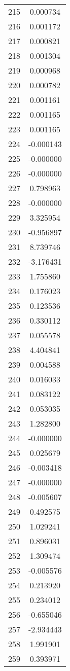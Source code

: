 \documentclass[12pt]{article}
\begin{document}
\begin{longtable}{@{}cc@{}}
215 & 0.000734 \\
216 & 0.001172 \\
217 & 0.000821 \\
218 & 0.001304 \\
219 & 0.000968 \\
220 & 0.000782 \\
221 & 0.001161 \\
222 & 0.001165 \\
223 & 0.001165 \\
224 & -0.000143 \\
225 & -0.000000 \\
226 & -0.000000 \\
227 & 0.798963 \\
228 & -0.000000 \\
229 & 3.325954 \\
230 & -0.956897 \\
231 & 8.739746 \\
232 & -3.176431 \\
233 & 1.755860 \\
234 & 0.176023 \\
235 & 0.123536 \\
236 & 0.330112 \\
237 & 0.055578 \\
238 & 4.404841 \\
239 & 0.004588 \\
240 & 0.016033 \\
241 & 0.083122 \\
242 & 0.053035 \\
243 & 1.282800 \\
244 & -0.000000 \\
245 & 0.025679 \\
246 & -0.003418 \\
247 & -0.000000 \\
248 & -0.005607 \\
249 & 0.492575 \\
250 & 1.029241 \\
251 & 0.896031 \\
252 & 1.309474 \\
253 & -0.005576 \\
254 & 0.213920 \\
255 & 0.234012 \\
256 & -0.655046 \\
257 & -2.934443 \\
258 & 1.991901 \\
259 & 0.393971 \\

\end{longtable}
\end{document}
